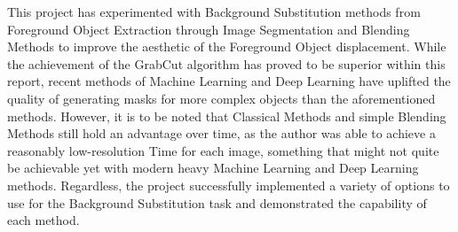 \documentclass{article}
\begin{document}
This project has experimented with Background Substitution methods from Foreground Object Extraction through Image Segmentation and Blending Methods to improve the aesthetic of the Foreground Object displacement. While the achievement of the GrabCut algorithm has proved to be superior within this report, recent methods of Machine Learning and Deep Learning have uplifted the quality of generating masks for more complex objects than the aforementioned methods. However, it is to be noted that Classical Methods and simple Blending Methods still hold an advantage over time, as the author was able to achieve a reasonably low-resolution Time for each image, something that might not quite be achievable yet with modern heavy Machine Learning and Deep Learning methods. Regardless, the project successfully implemented a variety of options to use for the Background Substitution task and demonstrated the capability of each method.

\end{document}
